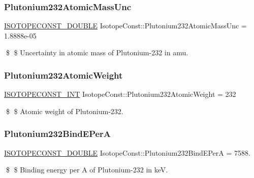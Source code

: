 \subsubsection{\texorpdfstring{Plutonium232\+Atomic\+Mass\+Unc}{Plutonium232AtomicMassUnc}}
{\footnotesize\ttfamily \mbox{\hyperlink{group___isotope_const-_macros_ga8f45a7272ce02c0b4c65c44636ed719a}{I\+S\+O\+T\+O\+P\+E\+C\+O\+N\+S\+T\+\_\+\+D\+O\+U\+B\+LE}} Isotope\+Const\+::\+Plutonium232\+Atomic\+Mass\+Unc = 1.\+8888e-\/05}

\$ \$ Uncertainty in atomic mass of Plutonium-\/232 in amu. \mbox{\label{group___isotope_const-_plutonium-_pu232_ga99b7fc6f390f42861cec5172195b58e4}} 
\subsubsection{\texorpdfstring{Plutonium232\+Atomic\+Weight}{Plutonium232AtomicWeight}}
{\footnotesize\ttfamily \mbox{\hyperlink{group___isotope_const-_macros_ga5f18360b3e99483a35c32d789e62621c}{I\+S\+O\+T\+O\+P\+E\+C\+O\+N\+S\+T\+\_\+\+I\+NT}} Isotope\+Const\+::\+Plutonium232\+Atomic\+Weight = 232}

\$ \$ Atomic weight of Plutonium-\/232. \mbox{\label{group___isotope_const-_plutonium-_pu232_gaaa7d72f661d86a23330edb28e5255312}} 
\subsubsection{\texorpdfstring{Plutonium232\+Bind\+E\+PerA}{Plutonium232BindEPerA}}
{\footnotesize\ttfamily \mbox{\hyperlink{group___isotope_const-_macros_ga8f45a7272ce02c0b4c65c44636ed719a}{I\+S\+O\+T\+O\+P\+E\+C\+O\+N\+S\+T\+\_\+\+D\+O\+U\+B\+LE}} Isotope\+Const\+::\+Plutonium232\+Bind\+E\+PerA = 7588.}

\$ \$ Binding energy per A of Plutonium-\/232 in keV. \mbox{\label{group___isotope_const-_plutonium-_pu232_gaa753280eed8451ff37975a36872aae20}} 
